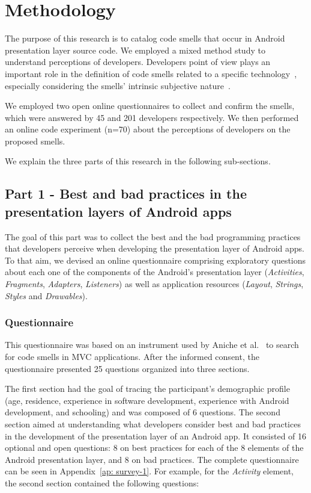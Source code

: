 \section{Methodology}

The purpose of this research is to catalog code smells that occur in Android presentation layer source code. We employed a mixed method study to understand perceptions of developers. Developers point of view plays an important role in the definition of code smells related to a specific technology~\cite{arcverde2011understanding, Palomba_Do_2014, yamashita2013developers}, especially considering the smells' intrinsic subjective nature~\cite{JavascriptSmells, JavaQADetectingSmells:02}.

We employed two open online questionnaires to collect and confirm the smells, which were answered by 45 and 201 developers respectively. We then performed an online code experiment (n=70) about the perceptions of developers on the proposed smells. 

We explain the three parts of this research in the following sub-sections.

\subsection{Part 1 - Best and bad practices in the presentation layers of Android apps}
\label{etapa-1}

The goal of this part was to collect the best and the bad programming practices 
that developers perceive when developing the presentation layer of Android apps.
To that aim, we devised an online questionnaire comprising exploratory questions
about each one of the components of the Android's presentation layer 
(\textit{Activities}, \textit{Fragments}, \textit{Adapters}, \textit{Listeners}) 
as well as application resources (\textit{Layout}, \textit{Strings}, 
\textit{Styles} and \textit{Drawables}). 

\subsubsection{Questionnaire}
\label{etapa-1-questionario}

This questionnaire was based on an instrument used by Aniche et al.~\cite{AnicheSmellsMVC:17, FinavaroAniche2016} to search for code smells in \acs{MVC} applications. 
After the informed consent, the questionnaire presented 25  questions organized into three sections.

The first section had the goal of tracing the participant's demographic profile (age, residence, experience in software development, experience with Android development, and schooling) and was composed of 6 questions. The second section aimed at understanding what developers consider best and bad practices in the development of the presentation layer of an Android app. It consisted of 16 optional and open questions: 8 on best practices for each of the 8 elements of the Android presentation layer, and 8 on bad practices. The complete questionnaire can be seen in Appendix~\ref{ap: survey-1}. 
For example, for the \textit{Activity} element, the second section contained the following questions:

